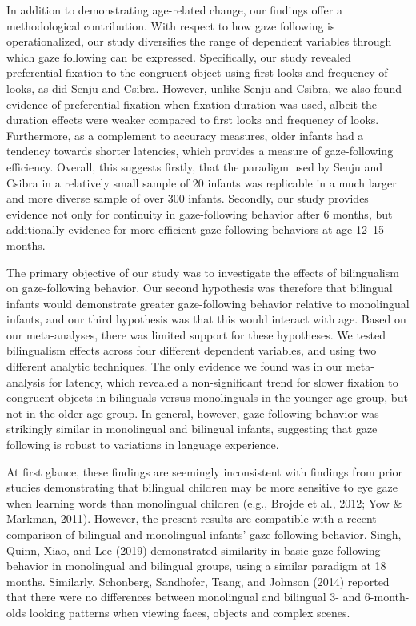 \documentclass[,man,floatsintext]{apa6}
\begin{document}
In addition to demonstrating age-related change, our findings offer a methodological contribution. With respect to how gaze following is operationalized, our study diversifies the range of dependent variables through which gaze following can be expressed. Specifically, our study revealed preferential fixation to the congruent object using first looks and frequency of looks, as did Senju and Csibra. However, unlike Senju and Csibra, we also found evidence of preferential fixation when fixation duration was used, albeit the duration effects were weaker compared to first looks and frequency of looks. Furthermore, as a complement to accuracy measures, older infants had a tendency towards shorter latencies, which provides a measure of gaze-following efficiency. Overall, this suggests firstly, that the paradigm used by Senju and Csibra in a relatively small sample of 20 infants was replicable in a much larger and more diverse sample of over 300 infants. Secondly, our study provides evidence not only for continuity in gaze-following behavior after 6 months, but additionally evidence for more efficient gaze-following behaviors at age 12--15 months.

The primary objective of our study was to investigate the effects of bilingualism on gaze-following behavior. Our second hypothesis was therefore that bilingual infants would demonstrate greater gaze-following behavior relative to monolingual infants, and our third hypothesis was that this would interact with age. Based on our meta-analyses, there was limited support for these hypotheses. We tested bilingualism effects across four different dependent variables, and using two different analytic techniques. The only evidence we found was in our meta-analysis for latency, which revealed a non-significant trend for slower fixation to congruent objects in bilinguals versus monolinguals in the younger age group, but not in the older age group. In general, however, gaze-following behavior was strikingly similar in monolingual and bilingual infants, suggesting that gaze following is robust to variations in language experience.

At first glance, these findings are seemingly inconsistent with findings from prior studies demonstrating that bilingual children may be more sensitive to eye gaze when learning words than monolingual children (e.g., Brojde et al., 2012; Yow \& Markman, 2011). However, the present results are compatible with a recent comparison of bilingual and monolingual infants' gaze-following behavior. Singh, Quinn, Xiao, and Lee (2019) demonstrated similarity in basic gaze-following behavior in monolingual and bilingual groups, using a similar paradigm at 18 months. Similarly, Schonberg, Sandhofer, Tsang, and Johnson (2014) reported that there were no differences between monolingual and bilingual 3- and 6-month-olds looking patterns when viewing faces, objects and complex scenes.
\end{document}
